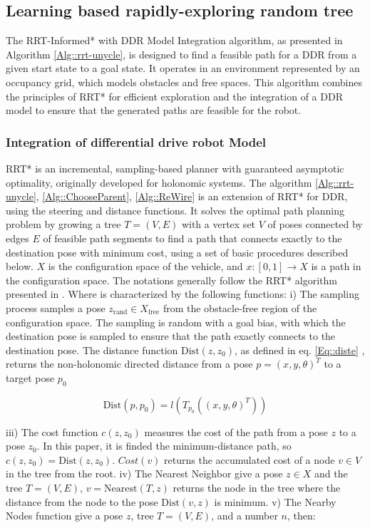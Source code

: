 \documentclass[conference]{IEEEtran}
\begin{document}
\subsection{Learning based rapidly-exploring random tree}
The RRT-Informed* with DDR Model Integration algorithm, as presented in Algorithm \ref{Alg::rrt-unycle}, is designed to find a feasible path for a DDR from a given start state to a goal state. It operates in an environment represented by an occupancy grid, which models obstacles and free spaces. This algorithm combines the principles of RRT* for efficient exploration and the integration of a DDR model to ensure that the generated paths are feasible for the robot.

\subsubsection{Integration of differential drive robot Model}
RRT* \cite{Qi2021} is an incremental, sampling-based planner with guaranteed asymptotic optimality, originally developed for holonomic systems. The algorithm \ref{Alg::rrt-unycle}, \ref{Alg::ChooseParent}, \ref{Alg::ReWire} is an extension of RRT* for DDR, using the steering and distance functions. It solves the optimal path planning problem by growing a tree $T = (V, E)$ with a vertex set $V$ of poses connected by edges $E$ of feasible path segments to find a path that connects exactly to the destination pose with minimum cost, using a set of basic procedures described below. $X$ is the configuration space of the vehicle, and $x: [0, 1] \to X$ is a path in the configuration space. The notations generally follow the RRT* algorithm presented in \cite{Qi2021}. Where is characterized by the following functions: i) The sampling process samples a pose $z_{\text{rand}} \in X_{\text{free}}$ from the obstacle-free region of the configuration space. The sampling is random with a goal bias, with which the destination pose is sampled to ensure that the path exactly connects to the destination pose. The distance function $\text{Dist}(z, z_0)$, as defined in eq. \ref{Eq::diste} , returns the non-holonomic directed distance from a pose $p = (x, y, \theta)^T$  to a target pose  $p_{0}$

\begin{equation}
\label{Eq::diste}
   \text{Dist}(p, p_0) = l(T_{p_0}((x, y, \theta)^T))
\end{equation}


\noindent iii) The cost function $c(z, z_0)$ measures the cost of the path from a pose $z$ to a pose $z_0$. In this paper, it is finded the minimum-distance path, so $c(z, z_0) = \text{Dist}(z, z_0)$. $Cost(v)$ returns the accumulated cost of a node $v \in V$ in the tree from the root. iv) The Nearest Neighbor give a pose $z \in X$ and the tree $T = (V, E)$, $v = \text{Nearest}(T, z)$ returns the node in the tree where the distance from the node to the pose $\text{Dist}(v, z)$ is minimum. v) The Nearby Nodes function give a pose $z$, tree $T = (V, E)$, and a number $n$, then:
\end{document}
